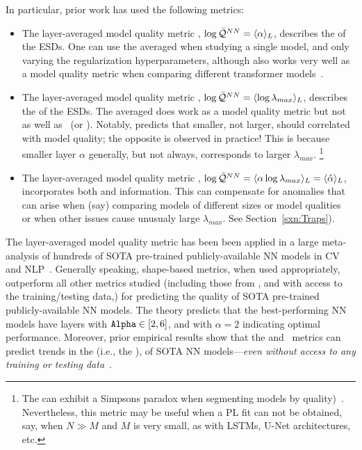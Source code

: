 \noindent
In particular, prior work has used the following metrics:
\begin{itemize}
\item
The layer-averaged model quality metric \ALPHA, $\log\bar{\mathcal{Q}}^{NN}=\langle\alpha\rangle_{L}$, describes the \SHAPE of the ESDs.
One can use the averaged \ALPHA when studying a single model, and only varying the regularization hyperparameters, although \ALPHA also works very well as a model quality metric when comparing different transformer models~\cite{YHTx21_TR}.
\item
The layer-averaged model quality metric \LOGSPECTRALNORM, $\log\bar{\mathcal{Q}}^{NN}=\langle\log\lambda_{max}\rangle_{L}$, describes the \SCALE of the ESDs.
The averaged \LOGSPECTRALNORM does work as a model quality metric but not as well as \ALPHA~(or \ALPHAHAT).
Notably, \SLT predicts that smaller, not larger, \LOGSPECTRALNORM should correlated with model quality; the opposite is observed in practice!
This is because smaller layer $\alpha$ generally, but not always, corresponds to larger $\lambda_{max}$.%
\footnote{The \LOGSPECTRALNORM can exhibit a Simpsons paradox when segmenting models by quality)~\cite{MM21a_simpsons_TR}.  Nevertheless, this metric may be useful when a PL fit can not be obtained, say, when $N\gg M$ and $M$ is very small, as with LSTMs,  U-Net architectures, etc.}
\item
The layer-averaged model quality metric \ALPHAHAT, $\log\bar{\mathcal{Q}}^{NN}=\langle\alpha\log\lambda_{max}\rangle_{L}=\langle\hat{\alpha}\rangle_{L}$, incorporates both \SHAPE and \SCALE information.
This can compensate for anomalies that can arise when (say) comparing models of different sizes or model qualities~\cite{MM21a_simpsons_TR} or when other issues cause unusualy large $\lambda_{max}$. See Section~\ref{sxn:Traps}).
\end{itemize}

\noindent
The layer-averaged \ALPHAHAT model quality metric has been been applied in a large meta-analysis of hundreds of SOTA 
pre-trained publicly-available NN models in CV and NLP~\cite{MM20a_trends_NatComm,YTHx22_TR,YTHx23_KDD,MM19a_TR}. 
%
Generally speaking, \HTSR shape-based metrics, when used appropriately, outperform all other metrics studied (including 
those from \SLT, and with access to the training/testing data,) for predicting the quality of SOTA pre-trained publicly-available NN models.  
%
The \HTSR theory predicts that the best-performing NN models have layers with $\texttt{Alpha}\in[2,6]$, and with $\alpha=2$
indicating optimal performance.
Moreover, prior empirical results show that the \ALPHA and \ALPHAHAT~metrics can predict trends in the \Quality 
(i.e., the \GeneralizationAccuracy), of SOTA NN models---\emph{even without access to any training or testing data}~\cite{MM20a_trends_NatComm}.



